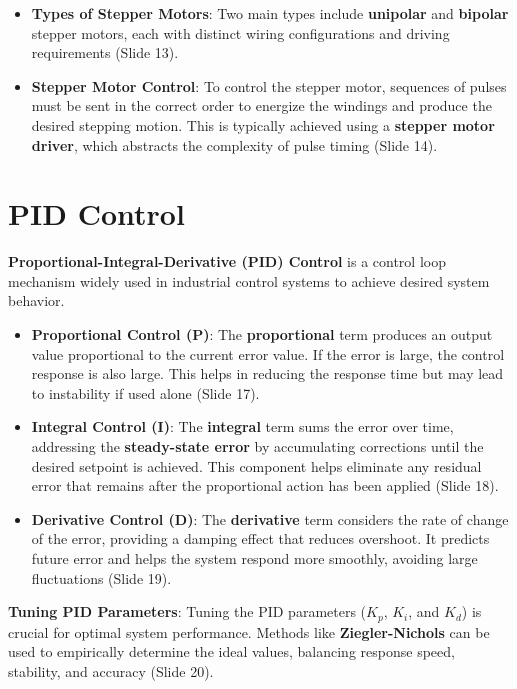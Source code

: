 \documentclass[
  14pt,
  a4paper,
  numbers=noendperiod,
  headinclude=true,
  footinclude=true,
  DIV=calc]{scrreprt}
\begin{document}
\begin{itemize}
\item
  \textbf{Types of Stepper Motors}: Two main types include
  \textbf{unipolar} and \textbf{bipolar} stepper motors, each with
  distinct wiring configurations and driving requirements (Slide 13).
\item
  \textbf{Stepper Motor Control}: To control the stepper motor,
  sequences of pulses must be sent in the correct order to energize the
  windings and produce the desired stepping motion. This is typically
  achieved using a \textbf{stepper motor driver}, which abstracts the
  complexity of pulse timing (Slide 14).
\end{itemize}

\section{PID Control}\label{pid-control}

\textbf{Proportional-Integral-Derivative (PID) Control} is a control
loop mechanism widely used in industrial control systems to achieve
desired system behavior.

\begin{itemize}
\item
  \textbf{Proportional Control (P)}: The \textbf{proportional} term
  produces an output value proportional to the current error value. If
  the error is large, the control response is also large. This helps in
  reducing the response time but may lead to instability if used alone
  (Slide 17).
\item
  \textbf{Integral Control (I)}: The \textbf{integral} term sums the
  error over time, addressing the \textbf{steady-state error} by
  accumulating corrections until the desired setpoint is achieved. This
  component helps eliminate any residual error that remains after the
  proportional action has been applied (Slide 18).
\item
  \textbf{Derivative Control (D)}: The \textbf{derivative} term
  considers the rate of change of the error, providing a damping effect
  that reduces overshoot. It predicts future error and helps the system
  respond more smoothly, avoiding large fluctuations (Slide 19).
\end{itemize}

\textbf{Tuning PID Parameters}: Tuning the PID parameters (\(K_p\),
\(K_i\), and \(K_d\)) is crucial for optimal system performance. Methods
like \textbf{Ziegler-Nichols} can be used to empirically determine the
ideal values, balancing response speed, stability, and accuracy (Slide
20).
\end{document}
